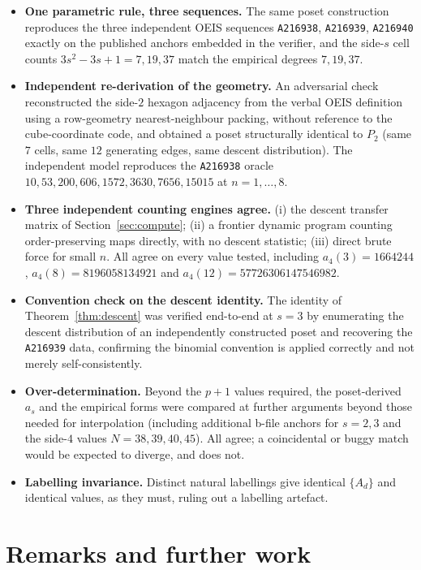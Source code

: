 \documentclass[11pt]{article}
\theoremstyle{plain}
\theoremstyle{definition}
\theoremstyle{remark}
\newcommand{\OEIS}[1]{\texttt{#1}}
\begin{document}
\begin{itemize}[leftmargin=1.4em]
  \item \textbf{One parametric rule, three sequences.} The same poset construction reproduces the
  three independent OEIS sequences \OEIS{A216938}, \OEIS{A216939}, \OEIS{A216940} exactly on the
  published anchors embedded in the verifier, and the side-$s$ cell counts
  $3s^2-3s+1=7,19,37$ match the empirical degrees $7,19,37$.
  \item \textbf{Independent re-derivation of the geometry.} An adversarial check reconstructed the
  side-$2$ hexagon adjacency from the verbal OEIS definition using a row-geometry nearest-neighbour
  packing, without reference to the cube-coordinate code, and obtained a poset structurally identical
  to $P_2$ (same $7$ cells, same $12$ generating edges, same descent distribution). The independent
  model reproduces the \OEIS{A216938} oracle $10,53,200,606,1572,3630,7656,15015$ at $n=1,\dots,8$.
  \item \textbf{Three independent counting engines agree.} (i) the descent transfer matrix of
  Section~\ref{sec:compute}; (ii) a frontier dynamic program counting order-preserving maps directly,
  with no descent statistic; (iii) direct brute force for small $n$. All agree on every value tested,
  including $a_4(3)=1664244$, $a_4(8)=8196058134921$ and $a_4(12)=57726306147546982$.
  \item \textbf{Convention check on the descent identity.} The identity of Theorem~\ref{thm:descent}
  was verified end-to-end at $s=3$ by enumerating the descent distribution of an independently
  constructed poset and recovering the \OEIS{A216939} data, confirming the binomial convention is
  applied correctly and not merely self-consistently.
  \item \textbf{Over-determination.} Beyond the $p+1$ values required, the poset-derived $a_s$ and the
  empirical forms were compared at further arguments beyond those needed for interpolation
  (including additional b-file anchors for $s=2,3$ and the side-$4$ values $N=38,39,40,45$).
  All agree; a coincidental or
  buggy match would be expected to diverge, and does not.
  \item \textbf{Labelling invariance.} Distinct natural labellings give identical $\{A_d\}$ and
  identical values, as they must, ruling out a labelling artefact.
\end{itemize}

\section{Remarks and further work}
\end{document}
